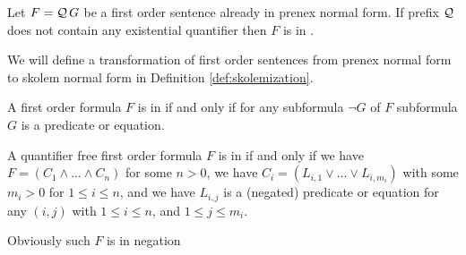 \begin{definition}\label{def:skolem:normal:form}
	Let \( F = \mathcal{Q}\,G \) be a first order sentence already
	in prenex normal form.
	If prefix \( \mathcal{Q} \) does not contain any existential quantifier
	then \( F \) is in .
\end{definition}

We will define a transformation of first order sentences 
from prenex normal form
to skolem normal form 
in Definition \vref{def:skolemization}.

\begin{definition}\label{def:negation:normal:form}
	A first order formula \( F \)
	is in 
	if and only if for any subformula \( \lnot G \) of \( F \)
	subformula \( G \)
	is a predicate or equation.
\end{definition}

\begin{definition}\label{def:negation:normal:form}
	A quantifier free first order formula \( F \)
	is in 
	if and only if 
	we have
	\( F = (C_1 \land ... \land C_n) \) for some \( n > 0 \),
	we have 
	\( C_i = (L_{i,1} \lor ... \lor L_{i, m_i}) \) with some \( m_i > 0 \)
	for \( 1 \leq i \leq n \), 
	and we have
	\( L_{i,j} \) 
	is a (negated) predicate or equation
	for any \((i,j)\) with
	\( 1 \leq i \leq n \), and
	\( 1 \leq j \leq m_i \).

	Obviously such \( F \) is in negation 
\end{definition}



